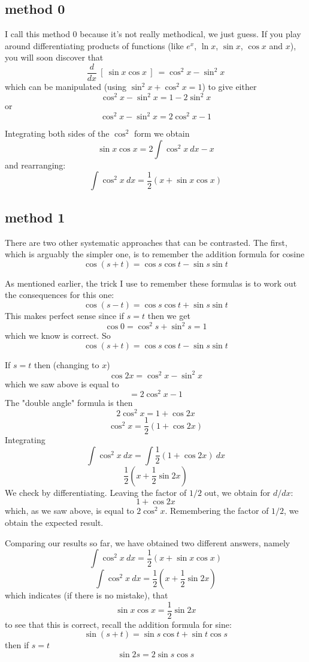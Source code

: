 \documentclass[11pt, oneside]{article}
\begin{document}
\subsection*{method 0}
I call this method 0 because it's not really methodical, we just guess.  If you play around differentiating products of functions (like $e^x$, $\ln x$, $\sin x$, $\cos x$ and $x$), you will soon discover that
\[ \frac{d}{dx} \ [ \ \sin x \cos x \ ] \ = \cos^2 x - \sin^2 x  \]
which can be manipulated (using $\sin^2 x + \cos^2 x = 1$) to give either
\[ \cos^2 x - \sin^2 x = 1- 2 \sin^2 x \]
or
\[ \cos^2 x - \sin^2 x = 2 \cos^2 x - 1 \]

Integrating both sides of the $\cos^2$ form we obtain
\[ \sin x \cos x = 2 \int \cos^2 x \ dx - x \]
and rearranging:
\[ \int \cos^2 x \ dx = \frac{1}{2} (x + \sin x \cos x) \]

\subsection*{method 1}
There are two other systematic approaches that can be contrasted.  The first, which is arguably the simpler one, is to remember the addition formula for cosine
\[ \cos (s+t) = \cos s \cos t - \sin s \sin t \]

As mentioned earlier, the trick I use to remember these formulas is to work out the consequences for this one:
\[ \cos (s-t) = \cos s \cos t + \sin s \sin t \]
This makes perfect sense since if $s=t$ then we get
\[ \cos 0 = \cos^2 s + \sin^2 s = 1 \]
which we know is correct.  So
\[ \cos (s+t) = \cos s \cos t - \sin s \sin t \]

If $s=t$ then (changing to $x$)
\[ \cos 2x = \cos^2 x  - \sin^2 x \]
which we saw above is equal to
\[ = 2\cos^2 x - 1 \]
The "double angle" formula is then
\[ 2 \cos^2 x = 1 + \cos 2 x \]
\[ \cos^2 x= \frac{1}{2} ( 1 + \cos 2x )  \]
Integrating
\[ \int \cos^2 x \ dx = \int \frac{1}{2} ( 1 + \cos 2x ) \ dx \]
\[ \frac{1}{2} ( x + \frac{1}{2} \sin 2x ) \]
We check by differentiating.  Leaving the factor of $1/2$ out, we obtain for $d/dx$:
\[ 1 + \cos 2x \]
which, as we saw above, is equal to $2 \cos^2 x$.  Remembering the factor of $1/2$, we obtain the expected result.

Comparing our results so far, we have obtained two different answers, namely
\[ \int \cos^2 x \ dx = \frac{1}{2} (x + \sin x \cos x) \]
\[ \int \cos^2 x \ dx = \frac{1}{2} ( x + \frac{1}{2} \sin 2x ) \]
which indicates (if there is no mistake), that
\[ \sin x \cos x = \frac{1}{2} \sin 2x  \]
to see that this is correct, recall the addition formula for sine:
\[ \sin (s+t) = \sin s \cos t + \sin t \cos s \]
then if $s=t$
\[ \sin 2s = 2 \sin s \cos s  \]
\end{document}
